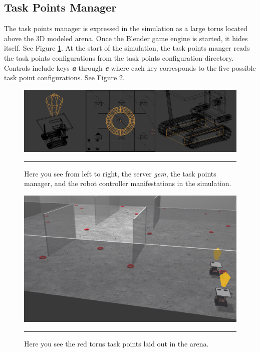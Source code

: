 \subsection{Task Points Manager}


The task points manager is expressed in the simulation as a large torus located above the 3D modeled arena. Once the Blender game engine is started, it hides itself. See Figure \ref{fig:blendersim_components}. At the start of the simulation, the task points manger reads the task points configurations from the task points configuration directory. Controls include keys \textit{\textbf{a}} through \textit{\textbf{e}} where each key corresponds to the five possible task point configurations. See Figure \ref{fig:task_points}. 

\begin{figure}[htbp]
\centering
\includegraphics[scale=0.4]{../Figures/Chapter5/parts.png}
\rule{35em}{0.5pt}
\caption[BlenderSim Components]{Here you see from left to right, the server \textit{gem}, the task points manager, and the robot controller manifestations in the simulation.}
\label{fig:blendersim_components}
\end{figure}

\begin{figure}[htbp]
\centering
\includegraphics[scale=0.32]{../Figures/Chapter5/taskPoints.png}
\rule{35em}{0.5pt}
\caption[Task Points]{Here you see the red torus task points laid out in the arena.}
\label{fig:task_points}
\end{figure}


